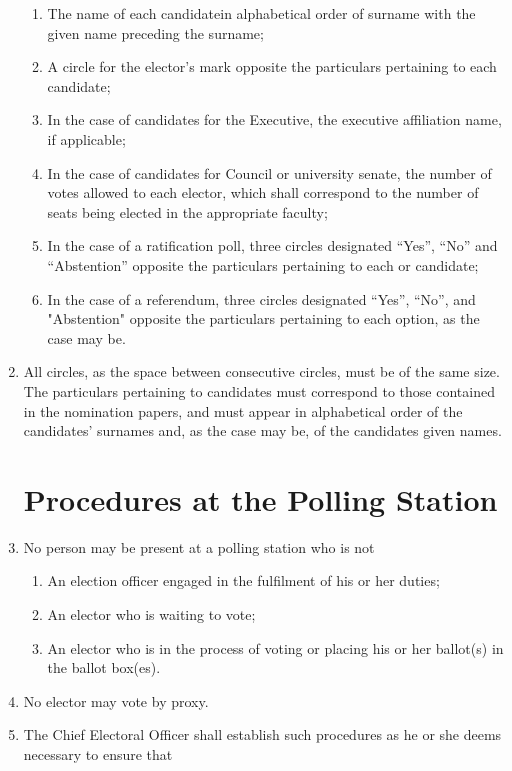 \documentclass[oneside]{book}
\begin{document}
\begin{enumerate}
\begin{enumerate}
\item The name of each candidatein alphabetical order of surname with the
given name preceding the surname; 
\item A circle for the elector's mark opposite the particulars pertaining
to each candidate; 
\item In the case of candidates for the Executive, the executive affiliation
name, if applicable; 
\item In the case of candidates for Council or university senate, the number
of votes allowed to each elector, which shall correspond to the number
of seats being elected in the appropriate faculty; 
\item In the case of a ratification poll, three circles designated ``Yes'',
``No'' and ``Abstention''
opposite the particulars pertaining to each or candidate; 
\item In the case of a referendum, three circles designated ``Yes'', ``No'', and "Abstention" 
opposite the particulars pertaining to each option, as the case may be. 
\end{enumerate}
\item All circles, as the space between consecutive circles, must be of
the same size. The particulars pertaining to candidates must correspond
to those contained in the nomination papers, and must appear in alphabetical
order of the candidates' surnames and, as the case may be, of the
candidates given names. 

\section{\label{Procedures_at_the_Polling_Station}Procedures at the Polling
Station }
\item No person may be present at a polling station who is not 

\begin{enumerate}
\item An election officer engaged in the fulfilment of his or her duties; 
\item An elector who is waiting to vote; 
\item An elector who is in the process of voting or placing his or her ballot(s)
in the ballot box(es). 
\end{enumerate}
\item No elector may vote by proxy. 
\item The Chief Electoral Officer shall establish such procedures as he
or she deems necessary to ensure that 


\end{enumerate}
\end{document}
